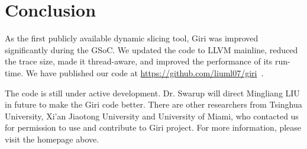 \documentclass[DIV=calc, paper=a4, fontsize=11pt, twocolumn]{scrartcl}
\begin{document}
\section{Conclusion}
\label{sec:contact}
As the first publicly available dynamic slicing tool,
Giri was improved significantly during the GSoC.
We updated the code to LLVM mainline, reduced the trace size, made it thread-aware, and improved the performance of its run-time.
We have published our code at \href{https://github.com/liuml07/giri}{https://github.com/liuml07/giri}~\cite{giri}.

The code is still under active development.
Dr. Swarup will direct Mingliang LIU in future to make the Giri code better.
There are other researchers from Tsinghua University, Xi'an Jiaotong University and University of Miami,
who contacted us for permission to use and contribute to Giri project.
For more information, please visit the homepage above.


 
\end{document}
